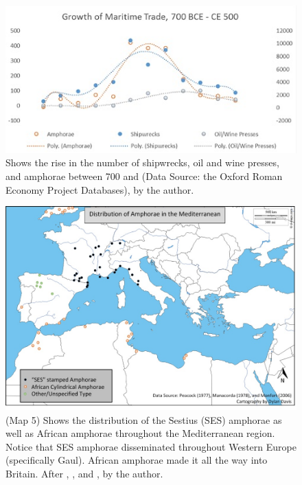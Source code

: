 	\begin{figure}[!p]
		\includegraphics[width=\linewidth]{figures/Davis_Agroeconomy_Fig7b.jpg}
		\centering
		\caption{Shows the rise in the number of shipwrecks, oil and wine presses, and amphorae between 700 \BC and  (Data Source: the Oxford Roman Economy Project Databases), by the author.}
		\label{fig:DavisFig7b}
	\end{figure}
	
	
	\begin{figure}[!p]
		\includegraphics[width=\linewidth]{figures/Davis_Agroeconomy_Map5.jpg}
		\centering
		\caption{(Map 5) Shows the distribution of the Sestius (SES) amphorae as well as African amphorae throughout the Mediterranean region. Notice that SES amphorae disseminated throughout Western Europe (specifically Gaul). African amphorae made it all the way into Britain. After \textcite{Peacock_1977}, \textcite{Manacorda_1978}, and \textcite{Monfort_2006}, by the author.}
		\label{fig:DavisMap5}
	\end{figure}
	
